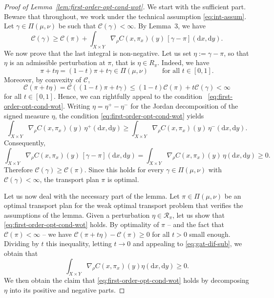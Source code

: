 \documentclass[leqno, 11pt, a4paper]{amsart}
\theoremstyle{definition}
\newcommand{\cR}{\mathcal{R}}
\newcommand{\C}{\mathscr{C}}
\newcommand{\dd}{\mathrm{d}}
\begin{document}
\begin{proof}[Proof of Lemma~\ref{lem:first-order-opt-cond-wot}]

We start with the sufficient part. Beware that throughout, we work under the technical assumption \eqref{eq:int-assum}. Let $\gamma \in \Pi(\mu,\nu)$ be such that $\C(\gamma)<\infty$. By Lemma~3, we have
$$
\C(\gamma) \geq \C(\pi) + \int_{X\times Y} \nabla_\rho C(x,\pi_x)(y)\,[\gamma-\pi](\dd x,\dd y).
$$
We now prove that the last integral is non-negative. Let us set $\eta := \gamma-\pi$, so that $\eta$ is an admissible perturbation at $\pi$, that is $\eta\in R_\pi$. Indeed, we have
$$
\pi+t\eta=(1-t)\pi+t\gamma\in\Pi(\mu,\nu) \qquad \text{for all } t \in [0,1].
$$
Moreover, by convexity of $\C$,
$$
\C(\pi+t\eta) = \C((1-t)\pi+t\gamma) \leq (1-t)\C(\pi)+t\C(\gamma) <\infty
$$
for all $t\in[0,1]$. Hence, we can rightfully appeal to the condition ~\eqref{eq:first-order-opt-cond-wot}. Writing $\eta=\eta^+-\eta^-$ for the Jordan decomposition of the signed measure $\eta$, the condition
\eqref{eq:first-order-opt-cond-wot} yields
$$
\int_{X\times Y} \nabla_\rho C(x,\pi_x)(y)\,\eta^+(\dd x,\dd y) \geq \int_{X\times Y} \nabla_\rho C(x,\pi_x)(y)\,\eta^-(\dd x,\dd y).
$$
Consequently,
$$
\int_{X\times Y} \nabla_\rho C(x,\pi_x)(y)\,[\gamma-\pi](\dd x,\dd y) = \int_{X\times Y} \nabla_\rho C(x,\pi_x)(y)\,\eta(\dd x,\dd y) \geq 0.
$$
Therefore $\C(\gamma)\geq \C(\pi)$. Since this holds for every $\gamma\in\Pi(\mu,\nu)$ with $\C(\gamma)<\infty$, the transport plan $\pi$ is optimal.

Let us now deal with the necessary part of the lemma. Let $\pi \in \Pi(\mu, \nu)$ be an optimal transport plan for the weak optimal transport problem that verifies the assumptions of the lemma. Given a perturbation $\eta \in \cR_\pi$, let us show that \eqref{eq:first-order-opt-cond-wot} holds. By optimality of $\pi$ -- and the fact that $\C(\pi) < \infty$ -- we have 
$\C(\pi + t\eta) - \C(\pi) \geq 0$ for all $t > 0$ small enough. Dividing by $t$ this inequality, letting $t \to 0$ and appealing to \eqref{eq:gat-dif-sub}, we obtain that
\begin{equation*}
	\int_{X \times Y} \nabla_\rho C(x, \pi_x) (y) \eta(\dd x,\dd y) \geq 0.
\end{equation*}
We then obtain the claim that \eqref{eq:first-order-opt-cond-wot} holds by decomposing $\eta$ into its positive and negative parts. 
\end{proof}
\end{document}
